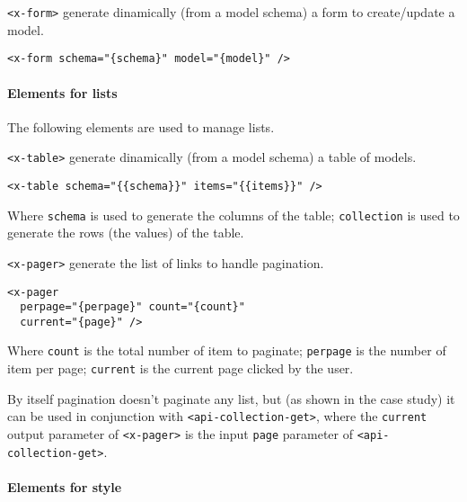 \vspace{0.2cm}

\texttt{<x-form>} generate dinamically (from a model schema) a form to create/update a model.

\begin{lstlisting}[language=HTML5]
<x-form schema="{schema}" model="{model}" />
\end{lstlisting}

\paragraph{Elements for lists}

The following elements are used to manage lists. 

\vspace{0.2cm}

\texttt{<x-table>} generate dinamically (from a model schema) a table of models. 

\begin{lstlisting}[language=HTML5]
<x-table schema="{{schema}}" items="{{items}}" />
\end{lstlisting}

Where \texttt{schema} is used to generate the columns of the table; 
\texttt{collection} is used to generate the rows (the values) of the table.

\vspace{0.2cm}

\texttt{<x-pager>} generate the list of links to handle pagination.

\begin{lstlisting}[language=HTML5]
<x-pager 
  perpage="{perpage}" count="{count}" 
  current="{page}" />
\end{lstlisting}

Where \texttt{count} is the total number of item to paginate; 
\texttt{perpage} is the number of item per page; 
\texttt{current} is the current page clicked by the user.

By itself pagination doesn't paginate any list, but (as shown in the case study) it can be used in conjunction with \texttt{<api-collection-get>}, where the \texttt{current} output parameter of \texttt{<x-pager>} is the input \texttt{page} parameter of \texttt{<api-collection-get>}.

\paragraph{Elements for style}

